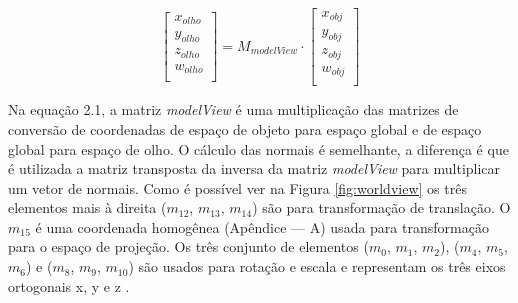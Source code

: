 	\begin{equation}
		\begin{bmatrix}
			x_{olho} \\
			y_{olho} \\
			z_{olho} \\
			w_{olho} \\
		\end{bmatrix}
		=
		M_{modelView} \cdot
		\begin{bmatrix}
			x_{obj} \\
			y_{obj} \\
			z_{obj} \\
			w_{obj} \\
		\end{bmatrix}
	\end{equation}

Na equação 2.1, a matriz \textit{modelView} é uma multiplicação das matrizes de conversão de coordenadas de espaço de objeto para espaço global e de espaço global para espaço de olho. O cálculo das normais é semelhante, a diferença é que é utilizada a matriz transposta da inversa da matriz \textit{modelView} para multiplicar um vetor de normais. Como é possível ver na Figura \ref{fig:worldview} os três elementos mais à direita ($ m_{12} $, $ m_{13} $, $ m_{14} $) são para transformação de translação. O $ m_{15} $ é uma coordenada homogênea (Apêndice --- A) usada para transformação para o espaço de projeção. Os três conjunto de elementos ($ m_{0} $, $ m_{1} $, $ m_{2} $), ($ m_{4} $, $ m_{5} $, $ m_{6} $) e ($ m_{8} $, $ m_{9} $, $ m_{10} $) são usados para rotação e escala e representam os três eixos ortogonais x, y e z \cite{openglOnline}.

	\begin{figure}[h!]
		\centering
	\end{figure}

